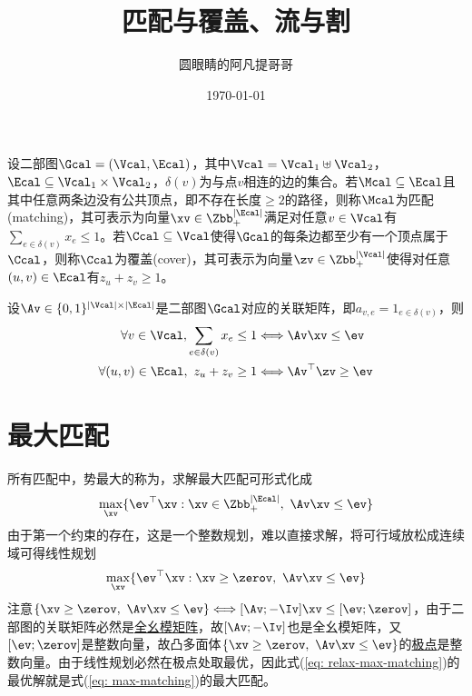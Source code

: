 \documentclass{ctexart}
\begin{document}
\title{匹配与覆盖、流与割}
\author{圆眼睛的阿凡提哥哥}
\date{\today}
\maketitle

设二部图$\Gcal = (\Vcal, \Ecal)$，其中$\Vcal = \Vcal_1 \uplus \Vcal_2$，$\Ecal \subseteq \Vcal_1 \times \Vcal_2$，$\delta(v)$为与点$v$相连的边的集合。若$\Mcal \subseteq \Ecal$且其中任意两条边没有公共顶点，即不存在长度$\ge 2$的路径，则称$\Mcal$为匹配(matching)，其可表示为向量$\xv \in \Zbb_+^{|\Ecal|}$满足对任意$v \in \Vcal$有$\sum_{e \in \delta(v)} x_e \le 1$。若$\Ccal \subseteq \Vcal$使得$\Gcal$的每条边都至少有一个顶点属于$\Ccal$，则称$\Ccal$为覆盖(cover)，其可表示为向量$\zv \in \Zbb_+^{|\Vcal|}$使得对任意$(u,v) \in \Ecal$有$z_u + z_v \ge 1$。

设$\Av \in \{ 0,1 \}^{|\Vcal| \times |\Ecal|}$是二部图$\Gcal$对应的关联矩阵，即$a_{v,e} = 1_{e \in \delta(v)}$，则
\begin{align*}
    \forall v \in \Vcal, \sum_{e \in \delta(v)} x_e \le 1 & \Longleftrightarrow \Av \xv \le \ev      \\
    \forall (u,v) \in \Ecal, ~ z_u + z_v \ge 1         & \Longleftrightarrow \Av^\top \zv \ge \ev
\end{align*}

\section{最大匹配}

所有匹配中，势最大的称为，求解最大匹配可形式化成
\begin{align} \label{eq: max-matching}
    \max_{\xv} \{ \ev^\top \xv : \xv \in \Zbb_+^{|\Ecal|}, ~ \Av \xv \le \ev \}
\end{align}
由于第一个约束的存在，这是一个整数规划，难以直接求解，将可行域放松成连续域可得线性规划
\begin{align} \label{eq: relax-max-matching}
    \max_{\xv} \{ \ev^\top \xv : \xv \ge \zerov, ~ \Av \xv \le \ev \}
\end{align}
注意$\{ \xv \ge \zerov, ~ \Av \xv \le \ev \} \Longleftrightarrow [\Av; -\Iv] \xv \le [\ev; \zerov]$，由于二部图的关联矩阵必然是\href{https://avanti1980.github.io/notes-on-math/posts/matrix/TU-matrix.html}{全幺模矩阵}，故$[\Av; -\Iv]$也是全幺模矩阵，又$[\ev; \zerov]$是整数向量，故凸多面体$\{ \xv \ge \zerov, ~ \Av \xv \le \ev \}$的\href{https://avanti1980.github.io/notes-on-math/posts/convex-optimization/extreme-point.html}{极点}是整数向量。由于线性规划必然在极点处取最优，因此式(\ref{eq: relax-max-matching})的最优解就是式(\ref{eq: max-matching})的最大匹配。
\end{document}

